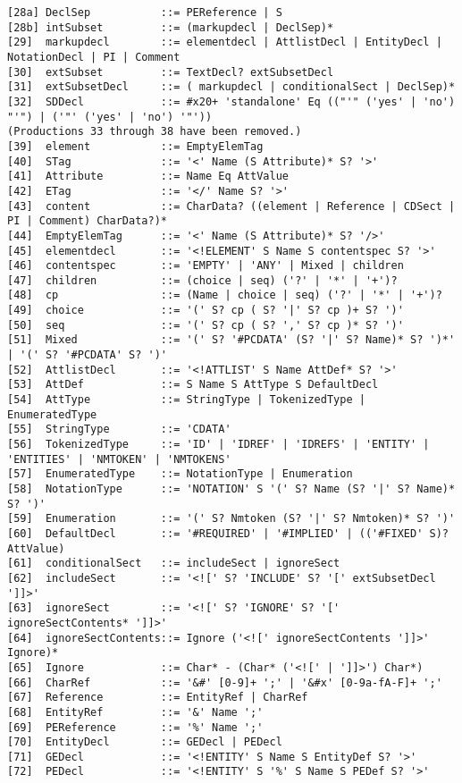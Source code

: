 \documentclass[aspectratio=1610,onlymath]{beamer}
\begin{document}
\begin{frame}[fragile]
\begin{verbatim}
[28a] DeclSep           ::= PEReference | S
[28b] intSubset         ::= (markupdecl | DeclSep)*
[29]  markupdecl        ::= elementdecl | AttlistDecl | EntityDecl | NotationDecl | PI | Comment
[30]  extSubset         ::= TextDecl? extSubsetDecl
[31]  extSubsetDecl     ::= ( markupdecl | conditionalSect | DeclSep)*
[32]  SDDecl            ::= #x20+ 'standalone' Eq (("'" ('yes' | 'no') "'") | ('"' ('yes' | 'no') '"'))
(Productions 33 through 38 have been removed.)
[39]  element           ::= EmptyElemTag
[40]  STag              ::= '<' Name (S Attribute)* S? '>'
[41]  Attribute         ::= Name Eq AttValue
[42]  ETag              ::= '</' Name S? '>'
[43]  content           ::= CharData? ((element | Reference | CDSect | PI | Comment) CharData?)*
[44]  EmptyElemTag      ::= '<' Name (S Attribute)* S? '/>'
[45]  elementdecl       ::= '<!ELEMENT' S Name S contentspec S? '>'
[46]  contentspec       ::= 'EMPTY' | 'ANY' | Mixed | children
[47]  children          ::= (choice | seq) ('?' | '*' | '+')?
[48]  cp                ::= (Name | choice | seq) ('?' | '*' | '+')?
[49]  choice            ::= '(' S? cp ( S? '|' S? cp )+ S? ')'
[50]  seq               ::= '(' S? cp ( S? ',' S? cp )* S? ')'
[51]  Mixed             ::= '(' S? '#PCDATA' (S? '|' S? Name)* S? ')*' | '(' S? '#PCDATA' S? ')'
[52]  AttlistDecl       ::= '<!ATTLIST' S Name AttDef* S? '>'
[53]  AttDef            ::= S Name S AttType S DefaultDecl
[54]  AttType           ::= StringType | TokenizedType | EnumeratedType
[55]  StringType        ::= 'CDATA'
[56]  TokenizedType     ::= 'ID' | 'IDREF' | 'IDREFS' | 'ENTITY' | 'ENTITIES' | 'NMTOKEN' | 'NMTOKENS'
[57]  EnumeratedType    ::= NotationType | Enumeration
[58]  NotationType      ::= 'NOTATION' S '(' S? Name (S? '|' S? Name)* S? ')'
[59]  Enumeration       ::= '(' S? Nmtoken (S? '|' S? Nmtoken)* S? ')'
[60]  DefaultDecl       ::= '#REQUIRED' | '#IMPLIED' | (('#FIXED' S)? AttValue)
[61]  conditionalSect   ::= includeSect | ignoreSect
[62]  includeSect       ::= '<![' S? 'INCLUDE' S? '[' extSubsetDecl ']]>'
[63]  ignoreSect        ::= '<![' S? 'IGNORE' S? '[' ignoreSectContents* ']]>'
[64]  ignoreSectContents::= Ignore ('<![' ignoreSectContents ']]>' Ignore)*
[65]  Ignore            ::= Char* - (Char* ('<![' | ']]>') Char*)
[66]  CharRef           ::= '&#' [0-9]+ ';' | '&#x' [0-9a-fA-F]+ ';'
[67]  Reference         ::= EntityRef | CharRef
[68]  EntityRef         ::= '&' Name ';'
[69]  PEReference       ::= '%' Name ';'
[70]  EntityDecl        ::= GEDecl | PEDecl
[71]  GEDecl            ::= '<!ENTITY' S Name S EntityDef S? '>'
[72]  PEDecl            ::= '<!ENTITY' S '%' S Name S PEDef S? '>'

\end{verbatim}
\end{frame}
\end{document}
